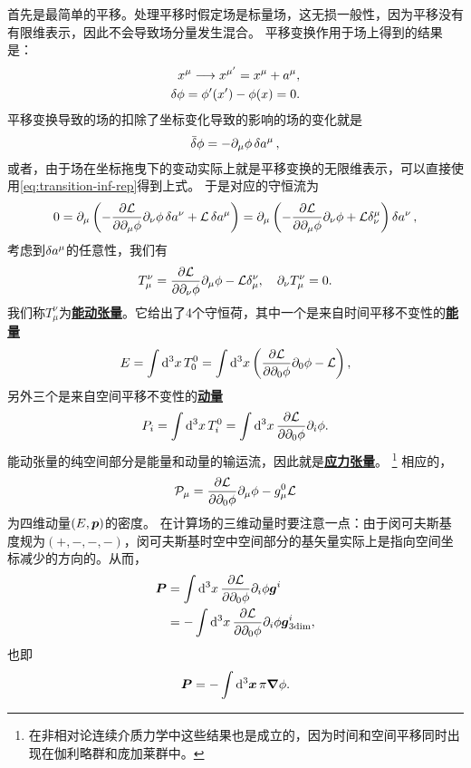 \documentclass[hyperref, UTF8, a4paper]{ctexart}
\newcommand{\concept}[1]{\underline{\textbf{#1}}}
\begin{document}
首先是最简单的平移。处理平移时假定场是标量场，这无损一般性，因为平移没有有限维表示，因此不会导致场分量发生混合。
平移变换作用于场上得到的结果是：
\[
    \begin{split}
        x^\mu \longrightarrow x^{\mu'} = x^\mu + a^\mu, \\
        \var{\phi} = \phi'(x') - \phi(x) = 0.
    \end{split}
\]
平移变换导致的场的扣除了坐标变化导致的影响的场的变化就是
\[
    \bar{\var}{\phi} = - \partial_\mu \phi \var{a^\mu},
\]
或者，由于场在坐标拖曳下的变动实际上就是平移变换的无限维表示，可以直接使用\eqref{eq:transition-inf-rep}得到上式。
于是对应的守恒流为
\[
    0 = \partial_\mu \left( - \pdv{\mathcal{L}}{\partial_\mu \phi} \partial_\nu \phi \var{a^\nu} + \mathcal{L} \var{a^\mu} \right) 
    = \partial_\mu \left( - \pdv{\mathcal{L}}{\partial_\mu \phi} \partial_\nu \phi + \mathcal{L} \delta^\mu_\nu \right) \var{a^\nu},
\]
考虑到$\var{a^\mu}$的任意性，我们有
\begin{equation}
    T_\mu^\nu = \pdv{\mathcal{L}}{\partial_\nu \phi} \partial_\mu \phi - \mathcal{L} \delta^\nu_\mu, \quad \partial_\nu T_\mu^\nu = 0.
\end{equation}
我们称$T^\nu_\mu$为\concept{能动张量}。它给出了4个守恒荷，其中一个是来自时间平移不变性的\concept{能量}
\begin{equation}
    E = \int \dd[3]{x} T^0_0 = \int \dd[3]{x} \left( \pdv{\mathcal{L}}{\partial_0 \phi} \partial_0 \phi - \mathcal{L} \right) ,
    \label{eq:field-energy}
\end{equation}
另外三个是来自空间平移不变性的\concept{动量}
\begin{equation}
    P_i = \int \dd[3]{x} T^0_i = \int \dd[3]{x} \pdv{\mathcal{L}}{\partial_0 \phi} \partial_i \phi .
    \label{eq:field-momentum}
\end{equation}
能动张量的纯空间部分是能量和动量的输运流，因此就是\concept{应力张量}。%
\footnote{在非相对论连续介质力学中这些结果也是成立的，因为时间和空间平移同时出现在伽利略群和庞加莱群中。}
相应的，
\begin{equation}
    \mathcal{P}_\mu = \pdv{\mathcal{L}}{\partial_0 \phi} \partial_\mu \phi - g_\mu^0 \mathcal{L}
\end{equation}
为四维动量$(E, \vb*{p})$的密度。
在计算场的三维动量时要注意一点：由于闵可夫斯基度规为$(+, -, -, -)$，闵可夫斯基时空中空间部分的基矢量实际上是指向空间坐标减少的方向的。从而，
\[
    \begin{aligned}
        \vb*{P} &= \int \dd[3]{x} \pdv{\mathcal{L}}{\partial_0 \phi} \partial_i \phi \vb*{g}^i \\
        &= - \int \dd[3]{x} \pdv{\mathcal{L}}{\partial_0 \phi} \partial_i \phi \vb*{g}^i_{\text{3dim}},
    \end{aligned}
\]
也即
\begin{equation}
    \vb*{P} = - \int \dd[3]{\vb*{x}} \pi \grad{\phi}.
\end{equation}
\end{document}
